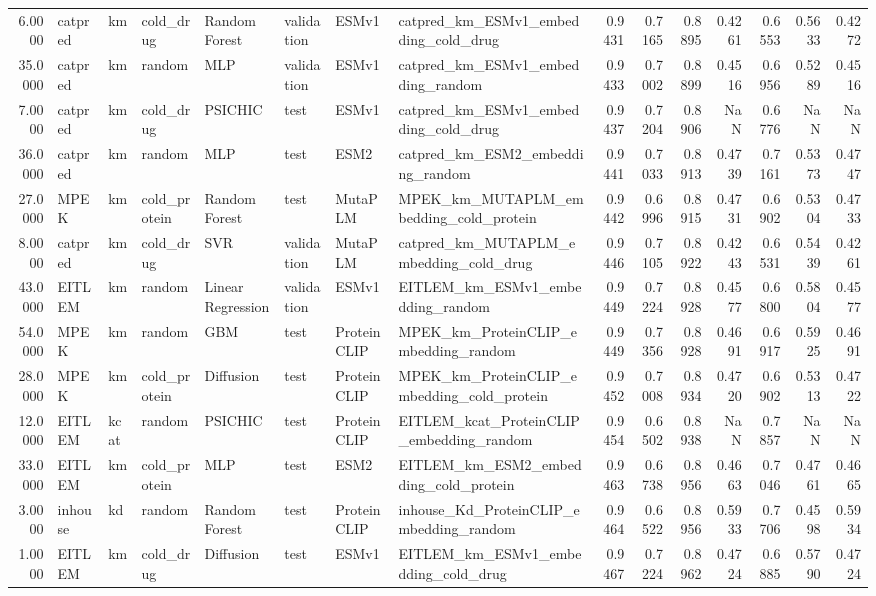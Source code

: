 \begin{tabular}{rlllllllrrrrrrr}
6.0000 & catpred & km & cold_drug & Random Forest & validation & ESMv1 & catpred_km_ESMv1_embedding_cold_drug & 0.9431 & 0.7165 & 0.8895 & 0.4261 & 0.6553 & 0.5633 & 0.4272 \\
35.0000 & catpred & km & random & MLP & validation & ESMv1 & catpred_km_ESMv1_embedding_random & 0.9433 & 0.7002 & 0.8899 & 0.4516 & 0.6956 & 0.5289 & 0.4516 \\
7.0000 & catpred & km & cold_drug & PSICHIC & test & ESMv1 & catpred_km_ESMv1_embedding_cold_drug & 0.9437 & 0.7204 & 0.8906 & NaN & 0.6776 & NaN & NaN \\
36.0000 & catpred & km & random & MLP & test & ESM2 & catpred_km_ESM2_embedding_random & 0.9441 & 0.7033 & 0.8913 & 0.4739 & 0.7161 & 0.5373 & 0.4747 \\
27.0000 & MPEK & km & cold_protein & Random Forest & test & MutaPLM & MPEK_km_MUTAPLM_embedding_cold_protein & 0.9442 & 0.6996 & 0.8915 & 0.4731 & 0.6902 & 0.5304 & 0.4733 \\
8.0000 & catpred & km & cold_drug & SVR & validation & MutaPLM & catpred_km_MUTAPLM_embedding_cold_drug & 0.9446 & 0.7105 & 0.8922 & 0.4243 & 0.6531 & 0.5439 & 0.4261 \\
43.0000 & EITLEM & km & random & Linear Regression & validation & ESMv1 & EITLEM_km_ESMv1_embedding_random & 0.9449 & 0.7224 & 0.8928 & 0.4577 & 0.6800 & 0.5804 & 0.4577 \\
54.0000 & MPEK & km & random & GBM & test & ProteinCLIP & MPEK_km_ProteinCLIP_embedding_random & 0.9449 & 0.7356 & 0.8928 & 0.4691 & 0.6917 & 0.5925 & 0.4691 \\
28.0000 & MPEK & km & cold_protein & Diffusion & test & ProteinCLIP & MPEK_km_ProteinCLIP_embedding_cold_protein & 0.9452 & 0.7008 & 0.8934 & 0.4720 & 0.6902 & 0.5313 & 0.4722 \\
12.0000 & EITLEM & kcat & random & PSICHIC & test & ProteinCLIP & EITLEM_kcat_ProteinCLIP_embedding_random & 0.9454 & 0.6502 & 0.8938 & NaN & 0.7857 & NaN & NaN \\
33.0000 & EITLEM & km & cold_protein & MLP & test & ESM2 & EITLEM_km_ESM2_embedding_cold_protein & 0.9463 & 0.6738 & 0.8956 & 0.4663 & 0.7046 & 0.4761 & 0.4665 \\
3.0000 & inhouse & kd & random & Random Forest & test & ProteinCLIP & inhouse_Kd_ProteinCLIP_embedding_random & 0.9464 & 0.6522 & 0.8956 & 0.5933 & 0.7706 & 0.4598 & 0.5934 \\
1.0000 & EITLEM & km & cold_drug & Diffusion & test & ESMv1 & EITLEM_km_ESMv1_embedding_cold_drug & 0.9467 & 0.7224 & 0.8962 & 0.4724 & 0.6885 & 0.5790 & 0.4724 \\

\end{tabular}
